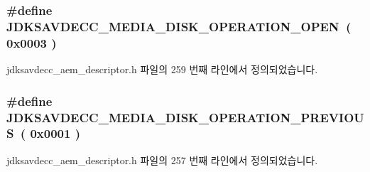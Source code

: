 \subsubsection[{\texorpdfstring{J\+D\+K\+S\+A\+V\+D\+E\+C\+C\+\_\+\+M\+E\+D\+I\+A\+\_\+\+D\+I\+S\+K\+\_\+\+O\+P\+E\+R\+A\+T\+I\+O\+N\+\_\+\+O\+P\+EN}{JDKSAVDECC_MEDIA_DISK_OPERATION_OPEN}}]{\setlength{\rightskip}{0pt plus 5cm}\#define J\+D\+K\+S\+A\+V\+D\+E\+C\+C\+\_\+\+M\+E\+D\+I\+A\+\_\+\+D\+I\+S\+K\+\_\+\+O\+P\+E\+R\+A\+T\+I\+O\+N\+\_\+\+O\+P\+EN~( 0x0003 )}\hypertarget{group__media__disk__operation_gab338c10f22049fd6b89a66e4e25a9969}{}\label{group__media__disk__operation_gab338c10f22049fd6b89a66e4e25a9969}


jdksavdecc\+\_\+aem\+\_\+descriptor.\+h 파일의 259 번째 라인에서 정의되었습니다.

\subsubsection[{\texorpdfstring{J\+D\+K\+S\+A\+V\+D\+E\+C\+C\+\_\+\+M\+E\+D\+I\+A\+\_\+\+D\+I\+S\+K\+\_\+\+O\+P\+E\+R\+A\+T\+I\+O\+N\+\_\+\+P\+R\+E\+V\+I\+O\+US}{JDKSAVDECC_MEDIA_DISK_OPERATION_PREVIOUS}}]{\setlength{\rightskip}{0pt plus 5cm}\#define J\+D\+K\+S\+A\+V\+D\+E\+C\+C\+\_\+\+M\+E\+D\+I\+A\+\_\+\+D\+I\+S\+K\+\_\+\+O\+P\+E\+R\+A\+T\+I\+O\+N\+\_\+\+P\+R\+E\+V\+I\+O\+US~( 0x0001 )}\hypertarget{group__media__disk__operation_gab494629109de2f7fd88079bbaa158b0e}{}\label{group__media__disk__operation_gab494629109de2f7fd88079bbaa158b0e}


jdksavdecc\+\_\+aem\+\_\+descriptor.\+h 파일의 257 번째 라인에서 정의되었습니다.

